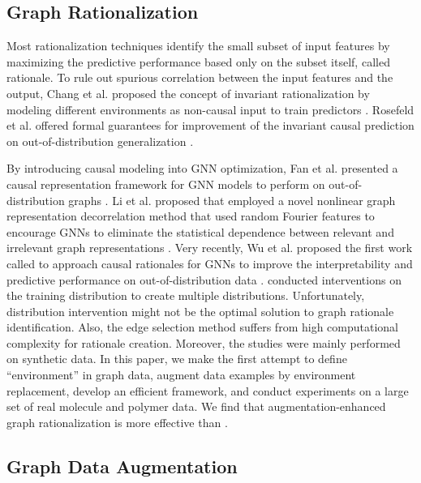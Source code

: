 \documentclass[sigconf]{acmart}
\begin{document}
\subsection{Graph Rationalization}

Most rationalization techniques identify the small subset of input features by maximizing the predictive performance based only on the subset itself, called rationale. To rule out spurious correlation between the input features and the output, Chang et al. proposed the concept of invariant rationalization by modeling different environments as non-causal input to train predictors \cite{chang2020invariant}. Rosefeld et al. offered formal guarantees for improvement of the invariant causal prediction on out-of-distribution generalization \cite{arjovsky2019invariant, rosenfeld2021risks}.

By introducing causal modeling into GNN optimization, Fan et al. presented a causal representation framework for GNN models to perform on out-of-distribution graphs \cite{fan2021generalizing}. Li et al. proposed \oodgnn that employed a novel nonlinear graph representation decorrelation method that used random Fourier features to encourage GNNs to eliminate the statistical dependence between relevant and irrelevant graph representations \cite{li2021ood}.
Very recently, Wu et al. proposed the first work called \dir to approach causal rationales for GNNs to improve the interpretability and predictive performance on out-of-distribution data \cite{wu2022discovering}. \dir conducted interventions on the training distribution to create multiple distributions. Unfortunately, distribution intervention might not be the optimal solution to graph rationale identification. Also, the edge selection method suffers from high computational complexity for rationale creation. Moreover, the studies were mainly performed on synthetic data.
In this paper, we make the first attempt to define ``environment'' in graph data, augment data examples by environment replacement, develop an efficient framework, and conduct experiments on a large set of real molecule and polymer data. We find that augmentation-enhanced graph rationalization is more effective than \dir.

\subsection{Graph Data Augmentation}
\end{document}
